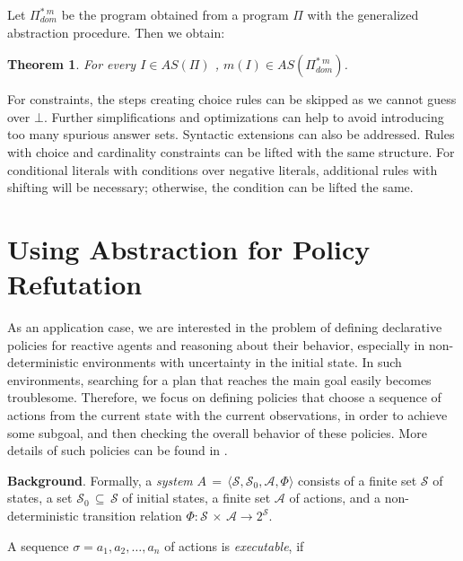 \documentclass{new_tlp}
\newcommand{\sys}{\ensuremath{A}}
\newcommand{\leanparagraph}[1]{\smallskip\noindent\textbf{#1}. }
\newtheorem{thm}{Theorem}[section]
\begin{document}
%
Let $\Pi_{dom}^{*\ m}$ be the program obtained from a program $\Pi$
with the generalized abstraction procedure.
Then we 
obtain:
\begin{thm}
For every $I \in AS(\Pi)$%
, $m(I) \in AS(\Pi_{dom}^{*\ m})$.
\end{thm}


For constraints, the
steps creating choice rules can be skipped 
as we cannot guess over $\bot$. 
Further simplifications and optimizations %
can help to 
avoid introducing too many spurious answer sets.
Syntactic extensions can also be addressed. Rules with choice and cardinality constraints can be lifted with the same structure. For conditional literals with conditions over negative literals, additional rules with shifting will be necessary; otherwise, the condition can be lifted the same.

\section{Using Abstraction for Policy Refutation}\label{abs_policy}

As an application case, we are interested in the problem of defining declarative policies for reactive agents and reasoning about their behavior, especially in non-deterministic environments with uncertainty in the initial state. In such environments, searching for a plan that reaches the main goal easily becomes troublesome. Therefore, we focus on defining policies that choose a sequence of actions from the current state with the current observations, in order to achieve some subgoal, and then checking the overall behavior of these policies. More details of such policies can be found in \cite{zgs16jelia}.

\leanparagraph{Background}
Formally, a \emph{system} 
$\sys\,{=}\,\langle \mathcal{S},\mathcal{S}_0,\mathcal{A},\Phi\rangle$
consists of a finite set $\mathcal{S}$ of states, a set
$\mathcal{S}_0 \,{\subseteq}\, \mathcal{S}$ of initial states, a finite set
$\mathcal{A}$ of actions, and a non-deterministic transition relation
$\Phi: \mathcal{S}\,{\times}\,\mathcal{A} \rightarrow 2^{\mathcal{S}}$. 


A sequence $\sigma=a_1,a_2,\dots,a_n$ of actions is \emph{executable}, if
\end{document}
